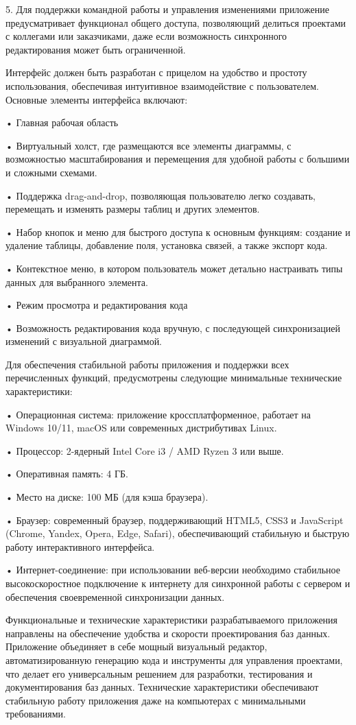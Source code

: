5. Для поддержки командной работы и управления изменениями приложение предусматривает функционал общего доступа, позволяющий делиться проектами с коллегами или заказчиками, даже если возможность синхронного редактирования может быть ограниченной.

Интерфейс должен быть разработан с прицелом на удобство и простоту использования, обеспечивая интуитивное взаимодействие с пользователем. Основные элементы интерфейса включают:

• Главная рабочая область

• Виртуальный холст, где размещаются все элементы диаграммы, с возможностью масштабирования и перемещения для удобной работы с большими и сложными схемами.

• Поддержка drag-and-drop, позволяющая пользователю легко создавать, перемещать и изменять размеры таблиц и других элементов.

• Набор кнопок и меню для быстрого доступа к основным функциям: создание и удаление таблицы, добавление поля, установка связей, а также экспорт кода.

• Контекстное меню, в котором пользователь может детально настраивать типы данных для выбранного элемента.

• Режим просмотра и редактирования кода

• Возможность редактирования кода вручную, с последующей синхронизацией изменений с визуальной диаграммой.


Для обеспечения стабильной работы приложения и поддержки всех перечисленных функций, предусмотрены следующие минимальные технические характеристики:

 • Операционная система: приложение кроссплатформенное, работает на Windows 10/11, macOS или современных дистрибутивах Linux.
 
 • Процессор: 2-ядерный Intel Core i3 / AMD Ryzen 3 или выше.
 
 • Оперативная память: 4 ГБ.
 
 • Место на диске: 100 МБ (для кэша браузера).
 
 • Браузер: современный браузер, поддерживающий HTML5, CSS3 и JavaScript (Chrome, Yandex, Opera, Edge, Safari), обеспечивающий стабильную и быструю работу интерактивного интерфейса.
 
 • Интернет-соединение: при использовании веб-версии необходимо стабильное высокоскоростное подключение к интернету для синхронной работы с сервером и обеспечения своевременной синхронизации данных.

Функциональные и технические характеристики разрабатываемого приложения направлены на обеспечение удобства и скорости проектирования баз данных. Приложение объединяет в себе мощный визуальный редактор, автоматизированную генерацию кода и инструменты для управления проектами, что делает его универсальным решением для разработки, тестирования и документирования баз данных. Технические характеристики обеспечивают стабильную работу приложения даже на компьютерах с минимальными требованиями.



